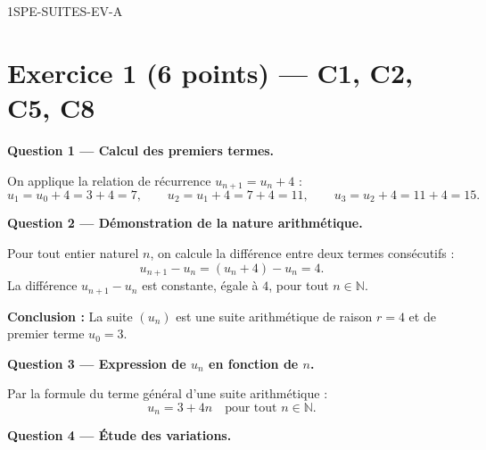 
\begin{corrige}{1SPE-SUITES-EV-A}

\section*{Exercice 1 \hfill (6 points) — C1, C2, C5, C8}


\bigskip
\textbf{Question 1 — Calcul des premiers termes.}


On applique la relation de récurrence $u_{n+1} = u_n + 4$ :
\[
  u_1 = u_0 + 4 = 3 + 4 = 7, \qquad
  u_2 = u_1 + 4 = 7 + 4 = 11, \qquad
  u_3 = u_2 + 4 = 11 + 4 = 15.
\]

\medskip
\textbf{Question 2 — Démonstration de la nature arithmétique.}


Pour tout entier naturel $n$, on calcule la différence entre deux termes consécutifs :
\[
  u_{n+1} - u_n = (u_n + 4) - u_n = 4.
\]
La différence $u_{n+1} - u_n$ est constante, égale à $4$, pour tout $n \in \mathbb{N}$.

\textbf{Conclusion :} La suite $(u_n)$ est une suite arithmétique de raison $r = 4$ et de premier terme $u_0 = 3$.

\medskip
\textbf{Question 3 — Expression de $u_n$ en fonction de $n$.}


Par la formule du terme général d'une suite arithmétique :
\[
  \boxed{u_n = 3 + 4n} \quad \text{pour tout } n \in \mathbb{N}.
\]

\medskip
\textbf{Question 4 — Étude des variations.}


\end{corrige}
